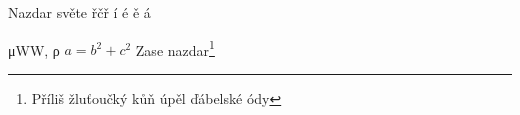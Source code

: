 \documentclass{article}
\begin{document}
Nazdar světe \v{r}\v{c}\v{r} \'i \'e \v{e} \'a


\textgreek{μWW, ρ } 
\(a=b^2 + c^2\)
Zase nazdar\footnote{Příliš žluťoučký kůň úpěl ďábelské ódy}
\end{document}
